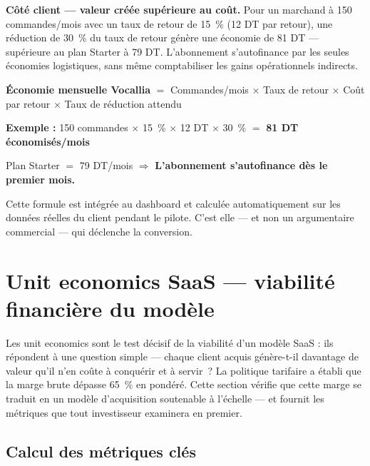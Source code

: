 \medskip
\noindent\textbf{Côté client --- valeur créée supérieure au coût.} Pour un marchand à 150 commandes/mois avec un taux de retour de 15~\% (12 DT par retour), une réduction de 30~\% du taux de retour génère une économie de 81 DT --- supérieure au plan Starter à 79 DT. L'abonnement s'autofinance par les seules économies logistiques, sans même comptabiliser les gains opérationnels indirects.

\begin{tcolorbox}[colback=gray!8, colframe=gray!50, title=\textbf{Formule de valeur --- outil de closing commercial}, fonttitle=\bfseries]
\textbf{Économie mensuelle Vocallia} $=$ Commandes/mois $\times$ Taux de retour $\times$ Coût par retour $\times$ Taux de réduction attendu

\medskip
\textbf{Exemple :} 150 commandes $\times$ 15~\% $\times$ 12 DT $\times$ 30~\% $=$ \textbf{81 DT économisés/mois}

Plan Starter $=$ 79 DT/mois $\Rightarrow$ \textbf{L'abonnement s'autofinance dès le premier mois.}

\medskip
\noindent Cette formule est intégrée au dashboard et calculée automatiquement sur les données réelles du client pendant le pilote. C'est elle --- et non un argumentaire commercial --- qui déclenche la conversion.
\end{tcolorbox}

\section{Unit economics SaaS --- viabilité financière du modèle}
\label{section3.9}

Les unit economics sont le test décisif de la viabilité d'un modèle SaaS : ils répondent à une question simple --- chaque client acquis génère-t-il davantage de valeur qu'il n'en coûte à conquérir et à servir~? La politique tarifaire a établi que la marge brute dépasse 65~\% en pondéré. Cette section vérifie que cette marge se traduit en un modèle d'acquisition soutenable à l'échelle --- et fournit les métriques que tout investisseur examinera en premier.

\subsection{Calcul des métriques clés}
\label{section3.9.1}

